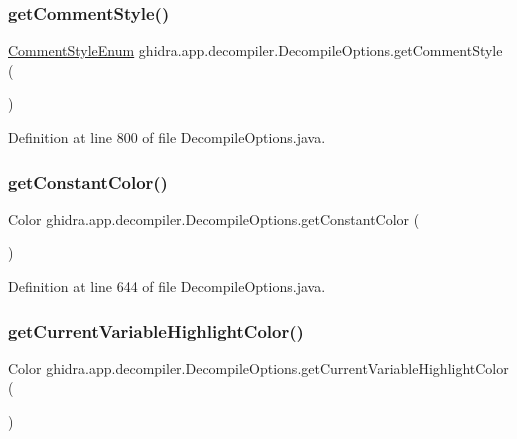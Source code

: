 \subsubsection{\texorpdfstring{getCommentStyle()}{getCommentStyle()}}
{\footnotesize\ttfamily \mbox{\hyperlink{enumghidra_1_1app_1_1decompiler_1_1_decompile_options_1_1_comment_style_enum}{Comment\+Style\+Enum}} ghidra.\+app.\+decompiler.\+Decompile\+Options.\+get\+Comment\+Style (\begin{DoxyParamCaption}{ }\end{DoxyParamCaption})\hspace{0.3cm}{\ttfamily [inline]}}



Definition at line 800 of file Decompile\+Options.\+java.

\mbox{\label{classghidra_1_1app_1_1decompiler_1_1_decompile_options_afc4366b2f3bd93979223cbf6b87c4e1e}} 
\subsubsection{\texorpdfstring{getConstantColor()}{getConstantColor()}}
{\footnotesize\ttfamily Color ghidra.\+app.\+decompiler.\+Decompile\+Options.\+get\+Constant\+Color (\begin{DoxyParamCaption}{ }\end{DoxyParamCaption})\hspace{0.3cm}{\ttfamily [inline]}}



Definition at line 644 of file Decompile\+Options.\+java.

\mbox{\label{classghidra_1_1app_1_1decompiler_1_1_decompile_options_ae698f1623b903cdf039ffed0bf8bbf16}} 
\subsubsection{\texorpdfstring{getCurrentVariableHighlightColor()}{getCurrentVariableHighlightColor()}}
{\footnotesize\ttfamily Color ghidra.\+app.\+decompiler.\+Decompile\+Options.\+get\+Current\+Variable\+Highlight\+Color (\begin{DoxyParamCaption}{ }\end{DoxyParamCaption})\hspace{0.3cm}{\ttfamily [inline]}}



